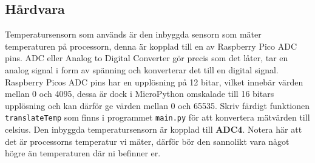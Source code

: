 \documentclass{article}
\begin{document}
\subsection{Hårdvara}
Temperatursensorn som används är den inbyggda sensorn som mäter temperaturen på processorn, denna är kopplad till en av Raspberry Pico ADC pins. ADC eller Analog to Digital Converter gör precis som det låter, tar en analog signal i form av spänning och konverterar det till en digital signal. Raspberry Picos ADC pins har en upplösning på 12 bitar, vilket innebär värden mellan 0 och 4095, dessa är dock i MicroPython omskalade till 16 bitars upplösning och kan därför ge värden mellan 0 och 65535. Skriv färdigt funktionen \texttt{translateTemp} som finns i programmet \texttt{main.py} för att konvertera mätvärden till celsius. Den inbyggda temperatursensorn är kopplad till \textbf{ADC4}. Notera här att det är processorns temperatur vi mäter, därför bör den sannolikt vara något högre än temperaturen där ni befinner er. 
\end{document}
